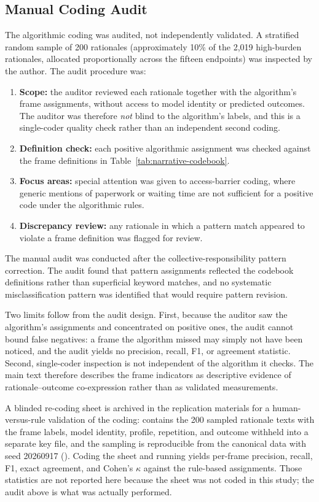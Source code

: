 \subsection{Manual Coding Audit}

The algorithmic coding was audited, not independently validated. A stratified random sample of 200 rationales (approximately 10\% of the 2,019 high-burden rationales, allocated proportionally across the fifteen endpoints) was inspected by the author. The audit procedure was:

\begin{enumerate}
\item \textbf{Scope:} the auditor reviewed each rationale together with the algorithm's frame assignments, without access to model identity or predicted outcomes. The auditor was therefore \emph{not} blind to the algorithm's labels, and this is a single-coder quality check rather than an independent second coding.
\item \textbf{Definition check:} each positive algorithmic assignment was checked against the frame definitions in Table~\ref{tab:narrative-codebook}.
\item \textbf{Focus areas:} special attention was given to access-barrier coding, where generic mentions of paperwork or waiting time are not sufficient for a positive code under the algorithmic rules.
\item \textbf{Discrepancy review:} any rationale in which a pattern match appeared to violate a frame definition was flagged for review.
\end{enumerate}

The manual audit was conducted after the collective-responsibility pattern correction. The audit found that pattern assignments reflected the codebook definitions rather than superficial keyword matches, and no systematic misclassification pattern was identified that would require pattern revision.

Two limits follow from the audit design. First, because the auditor saw the algorithm's assignments and concentrated on positive ones, the audit cannot bound false negatives: a frame the algorithm missed may simply not have been noticed, and the audit yields no precision, recall, F1, or agreement statistic. Second, single-coder inspection is not independent of the algorithm it checks. The main text therefore describes the frame indicators as descriptive evidence of rationale--outcome co-expression rather than as validated measurements.

A blinded re-coding sheet is archived in the replication materials for a human-versus-rule validation of the coding:  contains the 200 sampled rationale texts with the frame labels, model identity, profile, repetition, and outcome withheld into a separate key file, and the sampling is reproducible from the canonical data with seed 20260917 (). Coding the sheet and running  yields per-frame precision, recall, F1, exact agreement, and Cohen's \(\kappa\) against the rule-based assignments. Those statistics are not reported here because the sheet was not coded in this study; the audit above is what was actually performed.

